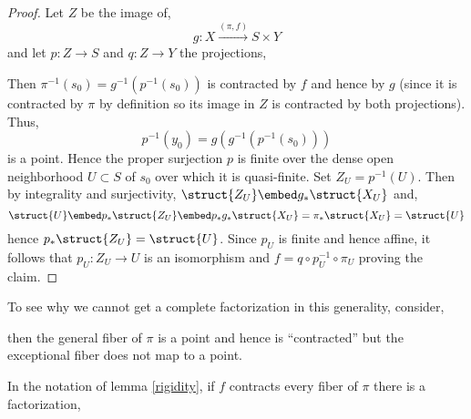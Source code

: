 \documentclass[12pt]{article}
\begin{document}
\begin{proof}
Let $Z$ be the image of,
\[ g : X \xrightarrow{(\pi, f)} S \times Y \]
and let $p : Z \to S$ and $q : Z \to Y$ the projections,
\begin{center}
\end{center} 
Then $\pi^{-1}(s_0) = g^{-1}(p^{-1}(s_0))$ is contracted by $f$ and hence by $g$ (since it is contracted by $\pi$ by definition so its image in $Z$ is contracted by both projections). Thus,
\[ p^{-1}(y_0) = g(g^{-1}(p^{-1}(s_0))) \]
is a point. Hence the proper surjection $p$ is finite over the dense open neighborhood $U \subset S$ of $s_0$ over which it is quasi-finite. Set $Z_U = p^{-1}(U)$. Then by integrality and surjectivity, $\struct{Z_U} \embed g_* \struct{X_U}$ and,
\[ \struct{U} \embed p_* \struct{Z_U} \embed p_* g_* \struct{X_U} = \pi_* \struct{X_U} = \struct{U} \]
hence $p_* \struct{Z_U} = \struct{U}$. Since $p_U$ is finite and hence affine, it follows that $p_U : Z_U \to U$ is an isomorphism and $f = q \circ p_U^{-1} \circ \pi_U$ proving the claim. 
\end{proof}

\begin{rmk}
To see why we cannot get a complete factorization in this generality, consider,
\begin{center}
\end{center}
then the general fiber of $\pi$ is a point and hence is ``contracted'' but the exceptional fiber does not map to a point. 
\end{rmk}

\begin{cor}
In the notation of lemma \ref{rigidity}, if $f$ contracts every fiber of $\pi$ there is a factorization,
\begin{center}
\end{center}
\end{cor}
\end{document}
